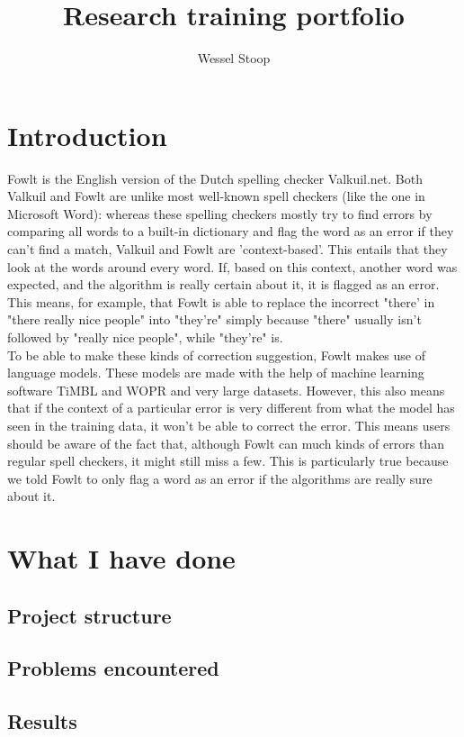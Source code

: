 \documentclass[12pt]{article}
\title{Research training portfolio}
\author{Wessel Stoop}
\begin{document}
\maketitle

\section{Introduction}
Fowlt is the English version of the Dutch spelling checker Valkuil.net. Both Valkuil and Fowlt are unlike most well-known spell checkers (like the one in Microsoft Word): whereas these spelling checkers mostly try to find errors by comparing all words to a built-in dictionary and flag the word as an error if they can't find a match, Valkuil and Fowlt are 'context-based'. This entails that they look at the words around every word. If, based on this context, another word was expected, and the algorithm is really certain about it, it is flagged as an error. This means, for example, that Fowlt is able to replace the incorrect "there' in "there really nice people" into "they're" simply because "there" usually isn't followed by "really nice people", while "they're" is. 
\\\indent
To be able to make these kinds of correction suggestion, Fowlt makes use of language models. These models are made with the help of machine learning software TiMBL and WOPR and very large datasets. However, this also means that if the context of a particular error is very different from what the model has seen in the training data, it won't be able to correct the error. This means users should be aware of the fact that, although Fowlt can much kinds of errors than regular spell checkers, it might still miss a few. This is particularly true because we told Fowlt to only flag a word as an error if the algorithms are really sure about it.

\section{What I have done}

\subsection{Project structure}
\subsection{Problems encountered}
\subsection{Results}
\end{document}
